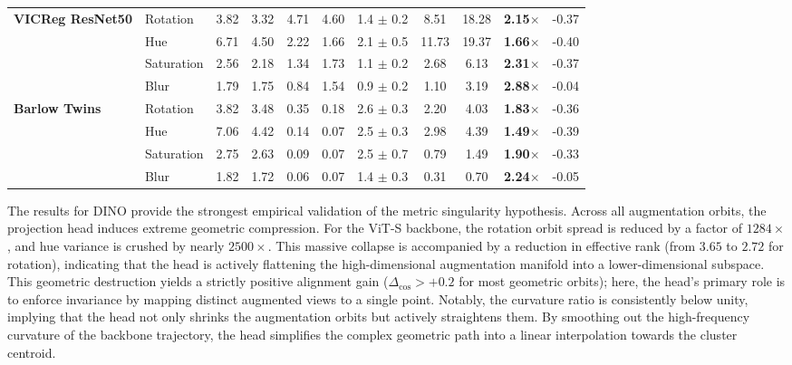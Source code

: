 \documentclass{article}
\theoremstyle{plain}
\theoremstyle{definition}
\theoremstyle{remark}
\begin{document}
\begin{table}[t]
\begin{tabular}{@{}llcc|cc|c|ccc|c@{}}
\multirow{4}{*}{\textbf{VICReg ResNet50}} 
& Rotation & 3.82 & 3.32 & 4.71 & 4.60 & 1.4 $\pm$ 0.2 & 8.51 & 18.28 & \textbf{2.15}$\times$ & -0.37 \\
& Hue & 6.71 & 4.50 & 2.22 & 1.66 & 2.1 $\pm$ 0.5 & 11.73 & 19.37 & \textbf{1.66}$\times$ & -0.40 \\
& Saturation & 2.56 & 2.18 & 1.34 & 1.73 & 1.1 $\pm$ 0.2 & 2.68 & 6.13 & \textbf{2.31}$\times$ & -0.37 \\
& Blur & 1.79 & 1.75 & 0.84 & 1.54 & 0.9 $\pm$ 0.2 & 1.10 & 3.19 & \textbf{2.88}$\times$ & -0.04 \\ \midrule

\multirow{4}{*}{\textbf{Barlow Twins}} 
& Rotation & 3.82 & 3.48 & 0.35 & 0.18 & 2.6 $\pm$ 0.3 & 2.20 & 4.03 & \textbf{1.83}$\times$ & -0.36 \\
& Hue & 7.06 & 4.42 & 0.14 & 0.07 & 2.5 $\pm$ 0.3 & 2.98 & 4.39 & \textbf{1.49}$\times$ & -0.39 \\
& Saturation & 2.75 & 2.63 & 0.09 & 0.07 & 2.5 $\pm$ 0.7 & 0.79 & 1.49 & \textbf{1.90}$\times$ & -0.33 \\
& Blur & 1.82 & 1.72 & 0.06 & 0.07 & 1.4 $\pm$ 0.3 & 0.31 & 0.70 & \textbf{2.24}$\times$ & -0.05 \\ \bottomrule

\end{tabular}
\end{table}

The results for DINO provide the strongest empirical validation of the metric singularity hypothesis. Across all augmentation orbits, the projection head induces extreme geometric compression. For the ViT-S backbone, the rotation orbit spread is reduced by a factor of $1284\times$, and hue variance is crushed by nearly $2500\times$. This massive collapse is accompanied by a reduction in effective rank (from $3.65$ to $2.72$ for rotation), indicating that the head is actively flattening the high-dimensional augmentation manifold into a lower-dimensional subspace. This geometric destruction yields a strictly positive alignment gain ($\Delta_{\text{cos}} > +0.2$ for most geometric orbits); here, the head’s primary role is to enforce invariance by mapping distinct augmented views to a single point. Notably, the curvature ratio is consistently below unity, implying that the head not only shrinks the augmentation orbits but actively straightens them. By smoothing out the high-frequency curvature of the backbone trajectory, the head simplifies the complex geometric path into a linear interpolation towards the cluster centroid.
\end{document}
